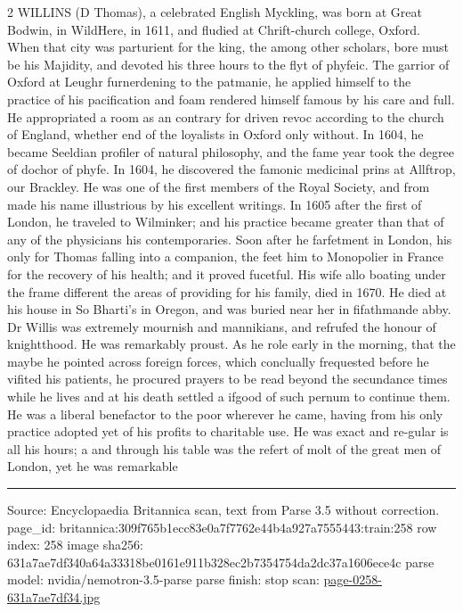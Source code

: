 \documentclass[10pt]{article}
\begin{document}
\begin{multicols}{2}
WILLINS (D Thomas), a celebrated English Myckling, was born at Great Bodwin, in WildHere, in 1611, and fludied at Chrift-church college, Oxford. When that city was parturient for the king, the among other scholars, bore must be his Majidity, and devoted his three hours to the flyt of phyfeic. The garrior of Oxford at Leughr furnerdening to the patmanie, he applied himself to the practice of his pacification and foam rendered himself famous by his care and full. He appropriated a room as an contrary for driven revoc according to the church of England, whether end of the loyalists in Oxford only without. In 1604, he became Seeldian profiler of natural philosophy, and the fame year took the degree of dochor of phyfe. In 1604, he discovered the famonic medicinal prins at Allftrop, our Brackley. He was one of the first members of the Royal Society, and from made his name illustrious by his excellent writings. In 1605 after the first of London, he traveled to Wilminker; and his practice became greater than that of any of the physicians his contemporaries. Soon after he farfetment in London, his only for Thomas falling into a companion, the feet him to Monopolier in France for the recovery of his health; and it proved fucetful. His wife allo boating under the frame different the areas of providing for his family, died in 1670. He died at his house in So Bharti's in Oregon, and was buried near her in fifathmande abby. Dr Willis was extremely mournish and mannikians, and refrufed the honour of knightthood. He was remarkably proust. As he role early in the morning, that the maybe he pointed across foreign forces, which conclually frequested before he vifited his patients, he procured prayers to be read beyond the secundance times while he lives and at his death settled a ifgood of such pernum to continue them. He was a liberal benefactor to the poor wherever he came, having from his only practice adopted yet of his profits to charitable use. He was exact and re-gular is all his hours; a and through his table was the refert of molt of the great men of London, yet he was remarkable

\end{multicols}
\vfill\par\noindent\rule{\linewidth}{0.4pt}\par
{\scriptsize\color{gray}\noindent Source: Encyclopaedia Britannica scan, text from Parse 3.5 without correction. page\_id: britannica:309f765b1ecc83e0a7f7762e44b4a927a7555443:train:258 \quad row index: 258 \quad image sha256: 631a7ae7df340a64a33318be0161e911b328ec2b7354754da2dc37a1606ece4c \quad parse model: nvidia/nemotron-3.5-parse \quad parse finish: stop \quad scan: \href{../scans/page-0258-631a7ae7df34.jpg}{page-0258-631a7ae7df34.jpg}\par}
\end{document}
